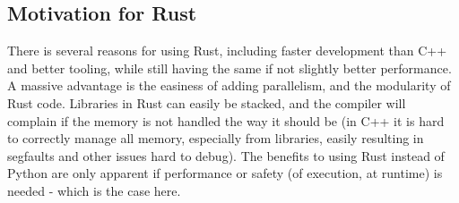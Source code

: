 \subsection{Motivation for Rust}

There is several reasons for using Rust, including faster development than C++
and better tooling, while still having the same if not slightly better
performance. A massive advantage is the easiness of adding parallelism, and the
modularity of Rust code. Libraries in Rust can easily be stacked, and the
compiler will complain if the memory is not handled the way it should be (in
C++ it is hard to correctly manage all memory, especially from libraries,
easily resulting in segfaults and other issues hard to debug). The benefits to
using Rust instead of Python are only apparent if performance or safety (of
execution, at runtime) is needed - which is the case here.




